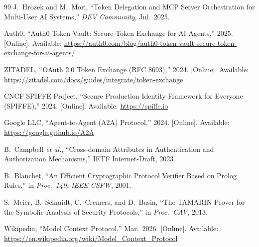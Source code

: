 \documentclass[journal]{IEEEtran}
\begin{document}
\begin{thebibliography}{99}
J.\ Hrozek and M.\ Mori,
``Token Delegation and MCP Server Orchestration for Multi-User AI Systems,''
\textit{DEV Community}, Jul.\ 2025.

Auth0,
``Auth0 Token Vault: Secure Token Exchange for AI Agents,'' 2025.
[Online]. Available:
\url{https://auth0.com/blog/auth0-token-vault-secure-token-exchange-for-ai-agents/}

ZITADEL,
``OAuth 2.0 Token Exchange (RFC 8693),'' 2024.
[Online]. Available:
\url{https://zitadel.com/docs/guides/integrate/token-exchange}

CNCF SPIFFE Project,
``Secure Production Identity Framework for Everyone (SPIFFE),'' 2024.
[Online]. Available: \url{https://spiffe.io}

Google LLC, ``Agent-to-Agent (A2A) Protocol,'' 2024.
[Online]. Available: \url{https://google.github.io/A2A}

B.\ Campbell \textit{et al.},
``Cross-domain Attributes in Authentication and Authorization Mechanisms,''
IETF Internet-Draft, 2023.

B.\ Blanchet,
``An Efficient Cryptographic Protocol Verifier Based on Prolog Rules,''
in \textit{Proc.\ 14th IEEE CSFW}, 2001.

S.\ Meier, B.\ Schmidt, C.\ Cremers, and D.\ Basin,
``The TAMARIN Prover for the Symbolic Analysis of Security Protocols,''
in \textit{Proc.\ CAV}, 2013.

Wikipedia,
``Model Context Protocol,'' Mar.\ 2026.
[Online]. Available:
\url{https://en.wikipedia.org/wiki/Model_Context_Protocol}

\end{thebibliography}
\end{document}
